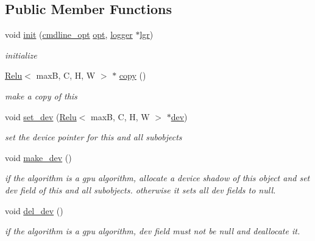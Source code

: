 \subsection*{Public Member Functions}
\begin{DoxyCompactItemize}
\item 
void \hyperlink{structRelu_af79e0373854c503faeda1928c0950b9b}{init} (\hyperlink{structcmdline__opt}{cmdline\+\_\+opt} \hyperlink{structRelu_a63f877be5c3cf3b8c89b57dbf2da0e68}{opt}, \hyperlink{structlogger}{logger} $\ast$\hyperlink{structRelu_af0064c033b32a241427e76c25b2eee41}{lgr})
\begin{DoxyCompactList}\small\item\em initialize \end{DoxyCompactList}\item 
\hyperlink{structRelu}{Relu}$<$ maxB, C, H, W $>$ $\ast$ \hyperlink{structRelu_ac5d197a3266cc0d939bc0d54ab23df9f}{copy} ()
\begin{DoxyCompactList}\small\item\em make a copy of this \end{DoxyCompactList}\item 
void \hyperlink{structRelu_a4e32ca92b471641ee2d5c1a252bab167}{set\+\_\+dev} (\hyperlink{structRelu}{Relu}$<$ maxB, C, H, W $>$ $\ast$\hyperlink{structRelu_a1e1271caca013c95ece064b47196d100}{dev})
\begin{DoxyCompactList}\small\item\em set the device pointer for this and all subobjects \end{DoxyCompactList}\item 
void \hyperlink{structRelu_a0109665896b86defceb3b7b5f4869075}{make\+\_\+dev} ()
\begin{DoxyCompactList}\small\item\em if the algorithm is a gpu algorithm, allocate a device shadow of this object and set dev field of this and all subobjects. otherwise it sets all dev fields to null. \end{DoxyCompactList}\item 
void \hyperlink{structRelu_a449f220c5cd23217aa463f68a8a4933a}{del\+\_\+dev} ()
\begin{DoxyCompactList}\small\item\em if the algorithm is a gpu algorithm, dev field must not be null and deallocate it. \end{DoxyCompactList}\item 
\mbox{\label{structRelu_aa039e9ae5722c8930b80fa9e44bf1b9d}} 

\end{DoxyCompactItemize}
